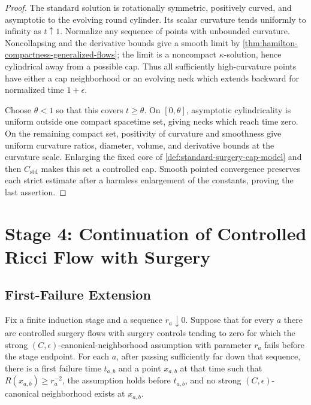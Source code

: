 \begin{proof}
The standard solution is rotationally symmetric, positively curved, and
asymptotic to the evolving round cylinder.  Its scalar curvature tends
uniformly to infinity as $t\uparrow1$.  Normalize any sequence of points with
unbounded curvature.  Noncollapsing and the derivative bounds give a smooth
limit by \ref{thm:hamilton-compactness-generalized-flows}; the limit is a
noncompact $\kappa$-solution, hence cylindrical away from a possible cap.
Thus all sufficiently high-curvature points have either a cap neighborhood
or an evolving neck which extends backward for normalized time
$1+\epsilon$.

Choose $\theta<1$ so that this covers $t\ge\theta$.  On
$[0,\theta]$, asymptotic cylindricality is uniform outside one compact
spacetime set, giving necks which reach time zero.  On the remaining compact
set, positivity of curvature and smoothness give uniform curvature ratios,
diameter, volume, and derivative bounds at the curvature scale.  Enlarging
the fixed core of \ref{def:standard-surgery-cap-model} and then
$C_{\mathrm{std}}$
makes this set a controlled cap.  Smooth pointed convergence preserves each
strict estimate after a harmless enlargement of the constants, proving the
last assertion.
\end{proof}

\section{Stage 4: Continuation of Controlled Ricci Flow with Surgery}

\subsection{First-Failure Extension}

\begin{lemma}
\label{lem:canonical-neighborhood-first-failure}
\notready
Fix a finite induction stage and a sequence $r_a\downarrow0$.  Suppose that
for every $a$ there are controlled surgery flows with surgery controls
tending to zero for which the strong $(C,\epsilon)$-canonical-neighborhood
assumption with parameter $r_a$ fails before the stage endpoint.  For each
$a$, after passing sufficiently far down that sequence, there is a first
failure time $t_{a,b}$ and a point $x_{a,b}$ at that time such that
$R(x_{a,b})\ge r_a^{-2}$, the assumption holds before $t_{a,b}$, and no
strong $(C,\epsilon)$-canonical neighborhood exists at $x_{a,b}$.
\end{lemma}

